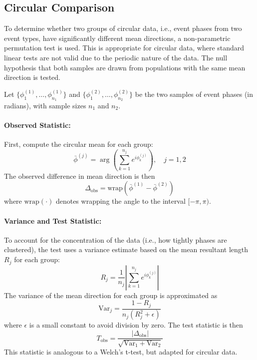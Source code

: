 \subsection{Circular Comparison} \label{subsec:circular-comparison}
To determine whether two groups of circular data, i.e., event phases from two event types, have significantly different mean directions, a non-parametric permutation test is used.
This is appropriate for circular data, where standard linear tests are not valid due to the periodic nature of the data.
The null hypothesis that both samples are drawn from populations with the same mean direction is tested.

Let $\{\phi_1^{(1)}, \ldots, \phi_{n_1}^{(1)}\}$ and $\{\phi_1^{(2)}, \ldots, \phi_{n_2}^{(2)}\}$ be the two samples of event phases (in radians), with sample sizes $n_1$ and $n_2$.

\paragraph{Observed Statistic:}
First, compute the circular mean for each group:
\begin{equation} \label{eq:circ-mean}
    \bar{\phi}^{(j)} = \arg\left( \sum_{k=1}^{n_j} e^{i \phi_k^{(j)}} \right), \quad j=1,2
\end{equation}
The observed difference in mean direction is then
\begin{equation} \label{eq:delta-obs}
    \Delta_{\text{obs}} = \mathrm{wrap}(\bar{\phi}^{(1)} - \bar{\phi}^{(2)})
\end{equation}
where $\mathrm{wrap}(\cdot)$ denotes wrapping the angle to the interval $[-\pi, \pi)$.

\paragraph{Variance and Test Statistic:}
To account for the concentration of the data (i.e., how tightly phases are clustered), the test uses a variance estimate based on the mean resultant length $R_j$ for each group:
\begin{equation} \label{eq:mean-resultant-length}
    R_j = \frac{1}{n_j} \left| \sum_{k=1}^{n_j} e^{i \phi_k^{(j)}} \right|
\end{equation}
The variance of the mean direction for each group is approximated as
\begin{equation} \label{eq:var-mean-dir}
    \mathrm{Var}_j = \frac{1 - R_j}{n_j (R_j^2 + \epsilon)}
\end{equation}
where $\epsilon$ is a small constant to avoid division by zero.
The test statistic is then
\begin{equation} \label{eq:circ-tstat}
    T_{\text{obs}} = \frac{|\Delta_{\text{obs}}|}{\sqrt{\mathrm{Var}_1 + \mathrm{Var}_2}}
\end{equation}
This statistic is analogous to a Welch's t-test, but adapted for circular data.

